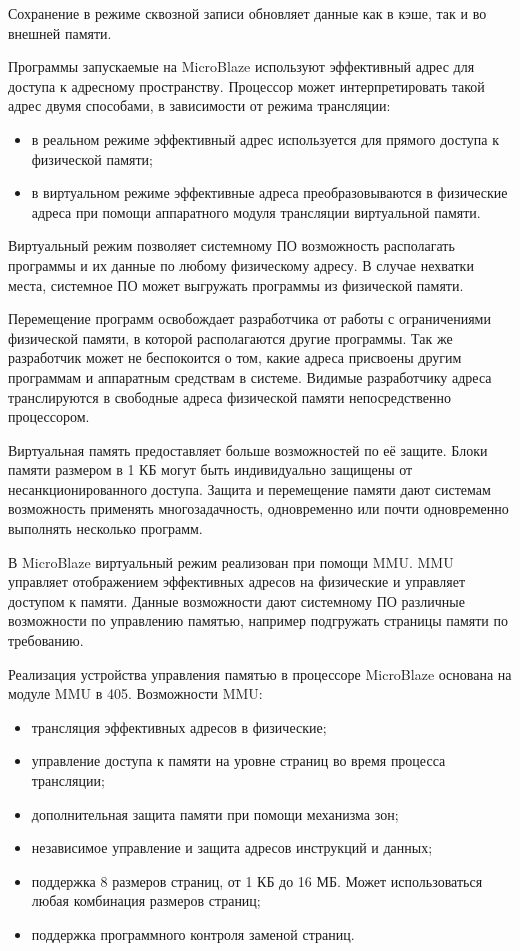 Сохранение в режиме сквозной записи обновляет данные как в кэше,
так и во внешней памяти.

Программы запускаемые на MicroBlaze используют эффективный адрес для доступа
к адресному пространству. Процессор может интерпретировать такой адрес двумя
способами, в зависимости от режима трансляции:
\begin{itemize}
  \item в реальном режиме эффективный адрес используется для прямого доступа к
  физической памяти;
  \item в виртуальном режиме эффективные адреса преобразовываются в физические адреса
  при помощи аппаратного модуля трансляции виртуальной памяти.
\end{itemize}

Виртуальный режим позволяет системному ПО возможность располагать программы и их данные по
любому физическому адресу. В случае нехватки места, системное ПО может выгружать программы
из физической памяти.

Перемещение программ освобождает разработчика от работы с ограничениями физической памяти,
в которой располагаются другие программы. Так же разработчик может не беспокоится
о том, какие адреса присвоены другим программам и аппаратным средствам в системе.
Видимые разработчику адреса транслируются в свободные адреса физической памяти непосредственно
процессором.

Виртуальная память предоставляет больше возможностей по её защите. Блоки памяти размером в
1 КБ могут быть индивидуально защищены от несанкционированного доступа. Защита и перемещение
памяти дают системам возможность применять многозадачность, одновременно или почти одновременно
выполнять несколько программ.

В MicroBlaze виртуальный режим реализован при помощи MMU. MMU управляет отображением
эффективных адресов на физические и управляет доступом к памяти. Данные возможности
дают системному ПО различные возможности по управлению памятью, например подгружать
страницы памяти по требованию.

Реализация устройства управления памятью в процессоре MicroBlaze основана на модуле MMU в  405.
Возможности MMU:
\begin{itemize}
  \item трансляция эффективных адресов в физические;
  \item управление доступа к памяти на уровне страниц во время
    процесса трансляции;
  \item дополнительная защита памяти при помощи механизма зон;
  \item независимое управление и защита адресов инструкций и данных;
  \item поддержка 8 размеров страниц, от 1 КБ до 16 МБ. Может использоваться
    любая комбинация размеров страниц;
  \item поддержка программного контроля заменой страниц.
\end{itemize}

